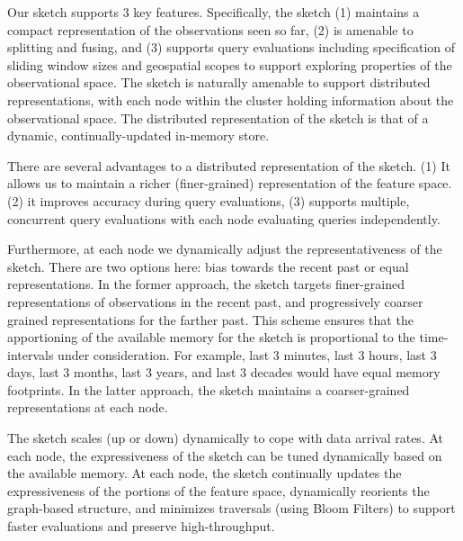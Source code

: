 Our sketch supports 3 key features. Specifically, the sketch (1) maintains a compact representation of the observations seen so far, (2) is amenable to splitting and fusing, and (3) supports query evaluations  including specification of sliding window sizes and geospatial scopes to support exploring properties of the observational space.  The sketch is naturally amenable to support distributed representations, with each node within the cluster holding information about the observational space. The distributed representation of the sketch is that of a dynamic, continually-updated in-memory store.

There are several advantages to a distributed representation of the sketch. (1) It allows us to maintain a richer (finer-grained) representation  of the feature space. (2) it improves accuracy during query evaluations, (3) supports multiple, concurrent query evaluations with each node evaluating queries independently.

Furthermore, at each node we dynamically adjust the representativeness of the sketch. There are two options here: bias towards the recent past or equal representations. In the former approach, the sketch targets finer-grained representations of observations in the recent past, and progressively coarser grained representations for the farther past. This scheme ensures that the apportioning of the available memory for the sketch is proportional to the time-intervals under consideration. For example, last 3 minutes, last 3 hours, last 3 days, last 3 months, last 3 years, and last 3 decades would have equal memory footprints.  In the latter approach, the sketch maintains a coarser-grained representations at each node.

The sketch scales (up or down) dynamically to cope with data arrival rates. At each node, the expressiveness of the sketch can be tuned dynamically based on the available memory. At each node, the sketch continually updates the expressiveness of the portions of the feature space, dynamically reorients the graph-based structure, and minimizes traversals (using Bloom Filters) to support faster evaluations and preserve high-throughput. 

